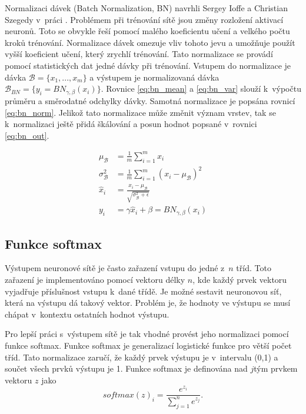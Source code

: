 Normalizaci dávek (Batch Normalization, BN) navrhli Sergey Ioffe a Christian Szegedy v~práci \cite{Ioffe2015}.
Problémem při trénování sítě jsou změny rozložení aktivací neuronů.
Toto se obvykle řeší pomocí malého koeficientu učení a velkého počtu kroků trénování.
Normalizace dávek omezuje vliv tohoto jevu a umožňuje použít vyšší koeficient učení, který zrychlí trénování.
Tato normalizace se provádí pomocí statistických dat jedné dávky při trénování.
Vstupem do normalizace je dávka $\mathcal{B}=\{x_{1}, ...,x_{m}\}$ a výstupem je normalizovaná dávka $\mathcal{B}_{BN}=\{y_{i}=BN_{\gamma,\beta}(x_{i})\}$.
Rovnice \ref{eq:bn_mean} a \ref{eq:bn_var} slouží k~výpočtu průměru a směrodatné odchylky dávky.
Samotná normalizace je popsána rovnicí \ref{eq:bn_norm}.
Jelikož tato normalizace může změnit význam vrstev, tak se k~normalizaci ještě přidá škálování a posun hodnot popsané v~rovnici \ref{eq:bn_out}.

\begin{align}
\mu _{\mathcal{B}}&=\frac{1}{m}\sum^{m}_{i=1}{x_i} \label{eq:bn_mean}\\
\sigma^{2}_{\mathcal{B}}&=\frac{1}{m}\sum^{m}_{i=1}{(x_i-\mu _{\mathcal{B}})^2} \label{eq:bn_var}\\
\hat{x}_i&=\frac{x_i-\mu _{\mathcal{B}}}{\sqrt{\sigma^{2}_{\mathcal{B}}+\epsilon}} \label{eq:bn_norm}\\
y_i&=\gamma \hat{x}_i+\beta=BN_{\gamma,\beta}(x_i) \label{eq:bn_out}
\end{align}

\subsection{Funkce softmax}
\label{sub:softmax}

Výstupem neuronové sítě je často zařazení vstupu do jedné z~$n$ tříd.
Toto zařazení je implementováno pomocí vektoru délky $n$, kde každý prvek vektoru vyjadřuje příslušnost vstupu k~dané třídě.
Je možné sestavit neuronovou síť, která na výstupu dá takový vektor.
Problém je, že hodnoty ve výstupu se musí chápat v~kontextu ostatních hodnot výstupu.

Pro lepší práci s~výstupem sítě je tak vhodné provést jeho normalizaci pomocí funkce softmax.
Funkce softmax je generalizací logistické funkce pro větší počet tříd.
Tato normalizace zaručí, že každý prvek výstupu je v~intervalu (0,1) a součet všech prvků výstupu je 1.
Funkce softmax je definována nad $j$tým prvkem vektoru $z$ jako \begin{equation}softmax(z)_{i}=\frac{e^{z_i}}{\sum^{n}_{j=1}{e^{z_j}}}.\label{eq:softmax}\end{equation}

